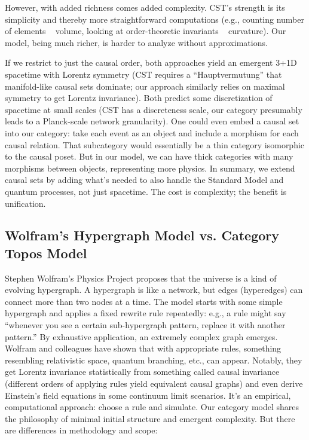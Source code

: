 \documentclass{article}
\begin{document}
However, with added richness comes added complexity. CST’s strength is its simplicity and thereby more straightforward computations (e.g., counting number of elements ~ volume, looking at order-theoretic invariants ~ curvature). Our model, being much richer, is harder to analyze without approximations.

If we restrict to just the causal order, both approaches yield an emergent 3+1D spacetime with Lorentz symmetry (CST requires a “Hauptvermutung” that manifold-like causal sets dominate; our approach similarly relies on maximal symmetry to get Lorentz invariance). Both predict some discretization of spacetime at small scales (CST has a discreteness scale, our category presumably leads to a Planck-scale network granularity). One could even embed a causal set into our category: take each event as an object and include a morphism for each causal relation. That subcategory would essentially be a thin category isomorphic to the causal poset. But in our model, we can have thick categories with many morphisms between objects, representing more physics. In summary, we extend causal sets by adding what’s needed to also handle the Standard Model and quantum processes, not just spacetime. The cost is complexity; the benefit is unification.

\subsection{Wolfram’s Hypergraph Model vs. Category Topos Model}

Stephen Wolfram’s Physics Project proposes that the universe is a kind of evolving hypergraph\cite{wolfram2020}. A hypergraph is like a network, but edges (hyperedges) can connect more than two nodes at a time. The model starts with some simple hypergraph and applies a fixed rewrite rule repeatedly: e.g., a rule might say “whenever you see a certain sub-hypergraph pattern, replace it with another pattern.” By exhaustive application, an extremely complex graph emerges. Wolfram and colleagues have shown that with appropriate rules, something resembling relativistic space, quantum branching, etc., can appear. Notably, they get Lorentz invariance statistically from something called causal invariance (different orders of applying rules yield equivalent causal graphs) and even derive Einstein’s field equations in some continuum limit scenarios. It’s an empirical, computational approach: choose a rule and simulate. Our category model shares the philosophy of minimal initial structure and emergent complexity\cite{wolfram2020}. But there are differences in methodology and scope:
\end{document}
